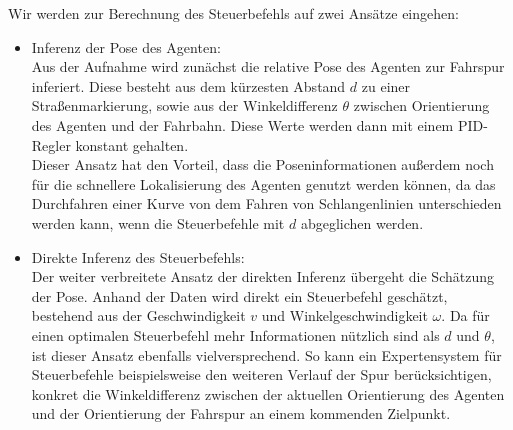 Wir werden zur Berechnung des Steuerbefehls auf zwei Ansätze eingehen:

\begin{itemize}
	\item Inferenz der Pose des Agenten:\\
	Aus der Aufnahme wird zunächst die relative Pose des Agenten zur Fahrspur inferiert. Diese besteht aus dem kürzesten Abstand $d$ zu einer Straßenmarkierung, sowie aus der Winkeldifferenz $\theta$ zwischen Orientierung des Agenten und der Fahrbahn. Diese Werte werden dann mit einem PID-Regler konstant gehalten.\\
	Dieser Ansatz hat den Vorteil, dass die Poseninformationen außerdem noch für die schnellere Lokalisierung des Agenten genutzt werden können, da das Durchfahren einer Kurve von dem Fahren von Schlangenlinien unterschieden werden kann, wenn die Steuerbefehle mit $d$ abgeglichen werden.
	\item Direkte Inferenz des Steuerbefehls:\\
	Der weiter verbreitete Ansatz der direkten Inferenz übergeht die Schätzung der Pose. Anhand der Daten wird direkt ein Steuerbefehl geschätzt, bestehend aus der Geschwindigkeit $v$ und Winkelgeschwindigkeit $\omega$. Da für einen optimalen Steuerbefehl mehr Informationen nützlich sind als $d$ und $\theta$, ist dieser Ansatz ebenfalls vielversprechend. So kann ein Expertensystem für Steuerbefehle beispielsweise den weiteren Verlauf der Spur berücksichtigen, konkret die Winkeldifferenz zwischen der aktuellen Orientierung des Agenten und der Orientierung der Fahrspur an einem kommenden Zielpunkt.
\end{itemize}
